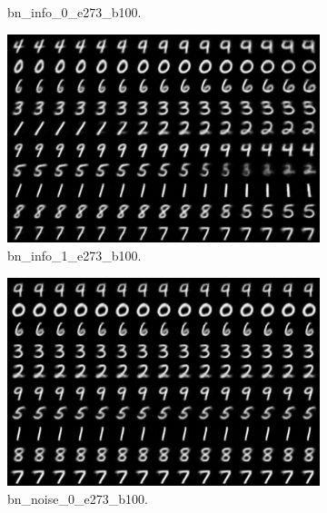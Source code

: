 \begin{figure}[!htbp]
\begin{subfigure}[t]{0.48\textwidth}
   \caption{bn_info_0_e273_b100.}
   \label{fig:.._.._notes_journal_figures_2019-04-24_compare_grad_mode-b}
\end{subfigure}
\begin{subfigure}[t]{0.48\textwidth}
   \includegraphics[width=\textwidth,center]{2019-04-24/compare_grad_mode/bn_info_1_e273_b100.png}
   \caption{bn_info_1_e273_b100.}
   \label{fig:.._.._notes_journal_figures_2019-04-24_compare_grad_mode-c}
\end{subfigure}
\begin{subfigure}[t]{0.48\textwidth}
   \includegraphics[width=\textwidth,center]{2019-04-24/compare_grad_mode/bn_noise_0_e273_b100.png}
   \caption{bn_noise_0_e273_b100.}
   \label{fig:.._.._notes_journal_figures_2019-04-24_compare_grad_mode-d}
\end{subfigure}
\begin{subfigure}[t]{0.48\textwidth}

\end{subfigure}
\end{figure}
